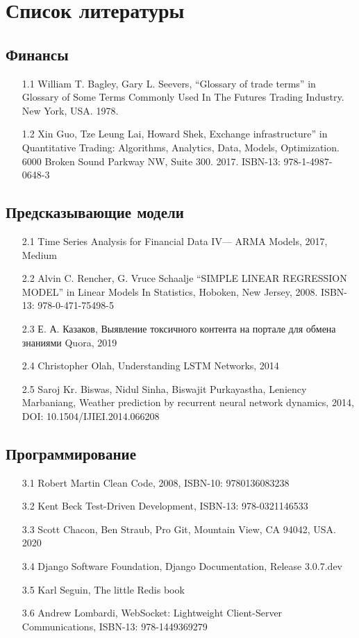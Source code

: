 \newpage
\section{Список литературы}
\subsection{Финансы}
\begin{itemize}
\item [1.1] William T. Bagley, Gary L. Seevers, “Glossary of trade terms” in Glossary of Some Terms Commonly Used In The Futures Trading Industry. New York, USA. 1978.
\item [1.2] Xin Guo, Tze Leung Lai, Howard Shek,
Exchange infrastructure” in Quantitative Trading: Algorithms, Analytics, Data, Models, Optimization. 6000 Broken Sound Parkway NW, Suite 300. 2017. ISBN-13: 978-1-4987- 0648-3
\end{itemize}
\subsection{Предсказывающие модели}
\begin{itemize}
\item [2.1] Time Series Analysis for Financial Data IV— ARMA Models, 2017, Medium
\item [2.2] Alvin C. Rencher, G. Vruce Schaalje “SIMPLE LINEAR REGRESSION MODEL” in Linear Models In Statistics, Hoboken, New Jersey, 2008. ISBN-13: 978-0-471-75498-5
\item [2.3] Е. А. Казаков, Выявление токсичного контента на портале для обмена знаниями Quora, 2019
\item [2.4] Christopher Olah, Understanding LSTM Networks, 2014
\item [2.5] Saroj Kr. Biswas, Nidul Sinha, Biswajit Purkayastha, Leniency Marbaniang, Weather prediction by recurrent neural network dynamics, 2014, DOI: 10.1504/IJIEI.2014.066208
\end{itemize}
\subsection{Программирование}
\begin{itemize}
\item [3.1] Robert Martin Clean Code, 2008, ISBN-10: 9780136083238
\item [3.2] Kent Beck Test-Driven Development, ISBN-13: 978-0321146533
\item [3.3] Scott Chacon, Ben Straub, Pro Git, Mountain View, CA 94042, USA. 2020
\item [3.4] Django Software Foundation, Django Documentation, Release 3.0.7.dev
\item [3.5] Karl Seguin, The little Redis book
\item [3.6] Andrew Lombardi, WebSocket: Lightweight Client-Server Communications, ISBN-13: 978-1449369279

\end{itemize}